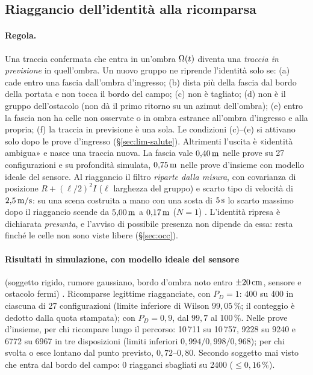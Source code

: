 \subsection{Riaggancio dell'identità alla ricomparsa}\label{sec:sti-riaggancio}

\paragraph{Regola.} Una traccia confermata che entra in un'ombra $\Omega(t)$ diventa una \emph{traccia in previsione} in quell'ombra. Un nuovo gruppo ne riprende l'identità solo se: (a) cade entro una fascia dall'ombra d'ingresso; (b) dista più della fascia dal bordo della portata e non tocca il bordo del campo; (c) non è tagliato; (d) non è il gruppo dell'ostacolo (non dà il primo ritorno su un azimut dell'ombra); (e) entro la fascia non ha celle non osservate o in ombra estranee all'ombra d'ingresso e alla propria; (f) la traccia in previsione è una sola. Le condizioni (c)--(e) si attivano solo dopo le prove d'ingresso (\S\ref{sec:lim-salute}). Altrimenti l'uscita è «identità ambigua» e nasce una traccia nuova. La fascia vale $0{,}40\,\mathrm{m}$ nelle prove su 27 configurazioni e su profondità simulata, $0{,}75\,\mathrm{m}$ nelle prove d'insieme con modello ideale del sensore. Al riaggancio il filtro \emph{riparte dalla misura}, con covarianza di posizione $R+(\ell/2)^2I$ ($\ell$ larghezza del gruppo) e scarto tipo di velocità di $2{,}5\,\mathrm{m/s}$: su una scena costruita a mano con una sosta di $5\,\mathrm{s}$ lo scarto massimo dopo il riaggancio scende da $5{,}00\,\mathrm{m}$ a $0{,}17\,\mathrm{m}$ ($N=1$) . L'identità ripresa è dichiarata \emph{presunta}, e l'avviso di possibile presenza non dipende da essa: resta finché le celle non sono viste libere (\S\ref{sec:occ}).

\paragraph{Risultati in simulazione, con modello ideale del sensore} (soggetto rigido, rumore gaussiano, bordo d'ombra noto entro $\pm20\,\mathrm{cm}$, sensore e ostacolo fermi) . Ricomparse legittime riagganciate, con $P_D=1$: 400 su 400 in ciascuna di 27 configurazioni (limite inferiore di Wilson $99{,}05\,\%$; il conteggio è dedotto dalla quota stampata); con $P_D=0{,}9$, dal $99{,}7$ al 100\,\%. Nelle prove d'insieme, per chi ricompare lungo il percorso: 10\,711 su 10\,757, 9228 su 9240 e 6772 su 6967 in tre disposizioni (limiti inferiori $0{,}994/0{,}998/0{,}968$); per chi svolta o esce lontano dal punto previsto, $0{,}72$--$0{,}80$. Secondo soggetto mai visto che entra dal bordo del campo: 0 riagganci sbagliati su 2400 ($\le0{,}16\,\%$).

